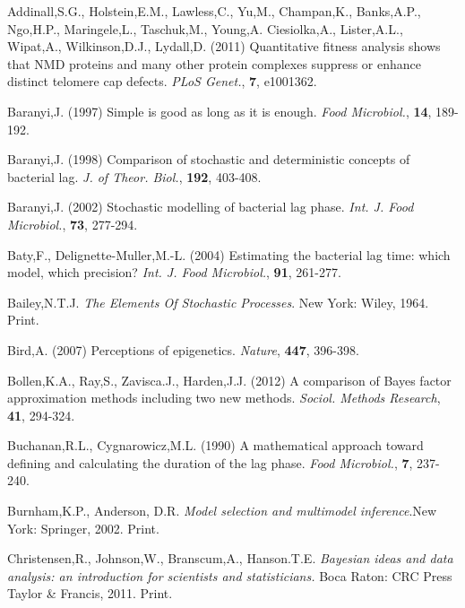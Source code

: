 \documentclass{bioinfo}
\begin{document}
\begin{thebibliography}{}

 Addinall,S.G., Holstein,E.M., Lawless,C., Yu,M., Champan,K., Banks,A.P., Ngo,H.P., Maringele,L., Taschuk,M., Young,A. Ciesiolka,A., Lister,A.L., Wipat,A., Wilkinson,D.J., Lydall,D. (2011) Quantitative fitness analysis shows that NMD proteins and many other protein complexes suppress or enhance distinct telomere cap defects. {\it PLoS Genet.}, {\bf 7}, e1001362.

 Baranyi,J. (1997) Simple is good as long as it is enough. {\it Food Microbiol.}, {\bf 14}, 189-192. 

 Baranyi,J. (1998) Comparison of stochastic and deterministic concepts of bacterial lag. {\it J. of Theor. Biol.}, {\bf 192}, 403-408. 

 Baranyi,J. (2002) Stochastic modelling of bacterial lag phase. {\it Int. J. Food Microbiol.}, {\bf 73}, 277-294. 

 Baty,F., Delignette-Muller,M.-L. (2004) Estimating the bacterial lag time: which model, which precision? {\it Int. J. Food Microbiol.}, {\bf 91}, 261-277. 

 Bailey,N.T.J. \textit{The Elements Of Stochastic Processes}. New York: Wiley, 1964. Print.

 Bird,A. (2007) Perceptions of epigenetics. {\it Nature}, {\bf 447}, 396-398.

 Bollen,K.A., Ray,S., Zavisca.J., Harden,J.J. (2012) A comparison of Bayes factor approximation methods including two new methods. {\it Sociol. Methods Research}, {\bf 41}, 294-324. 

 Buchanan,R.L., Cygnarowicz,M.L. (1990) A mathematical approach toward defining and calculating the duration of the lag phase. {\it Food Microbiol.}, {\bf 7}, 237-240.  

 Burnham,K.P., Anderson, D.R. \textit{Model selection and multimodel inference}.New York: Springer, 2002. Print. 

 Christensen,R., Johnson,W., Branscum,A., Hanson.T.E. {\it Bayesian ideas and data analysis: an introduction for scientists and statisticians.} Boca Raton: CRC Press Taylor \& Francis, 2011. Print. 


\end{thebibliography}
\end{document}
